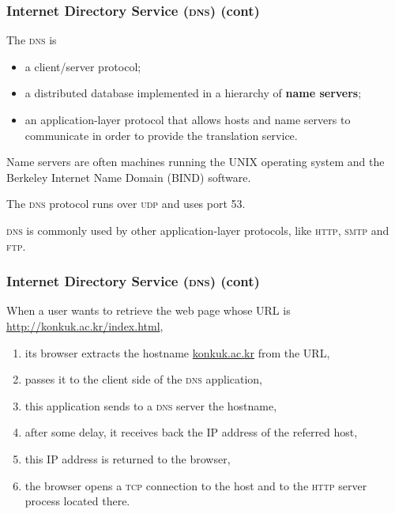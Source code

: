%
\begin{frame}
\frametitle{Internet Directory Service (\textsc{dns}) (cont)}

The \textsc{dns} is
\begin{itemize}

  \item a client/server protocol;

  \item a distributed database implemented in a hierarchy of
  \textbf{name servers};

  \item an application-layer protocol that allows hosts and name
  servers to communicate in order to provide the translation service.

\end{itemize}

Name servers are often machines running the UNIX operating system and
the Berkeley Internet Name Domain (BIND) software.

The \textsc{dns} protocol runs over \textsc{udp} and uses port 53. 

\textsc{dns} is commonly used by other application-layer protocols, like
\textsc{http}, \textsc{smtp} and \textsc{ftp}.

\end{frame}

%
\begin{frame}
\frametitle{Internet Directory Service (\textsc{dns}) (cont)}

When a user wants to retrieve the web page whose URL is
\url{http://konkuk.ac.kr/index.html}, 
\begin{enumerate}

  \item its browser extracts the hostname \url{konkuk.ac.kr} from the URL,

  \item passes it to the client side of the \textsc{dns} application,

  \item this application sends to a \textsc{dns} server the hostname,

  \item after some delay, it receives back the IP address of the
    referred host,

  \item this IP address is returned to the browser,

  \item the browser opens a \textsc{tcp} connection to the host and to
    the \textsc{http} server process located there.

\end{enumerate}

\end{frame}


